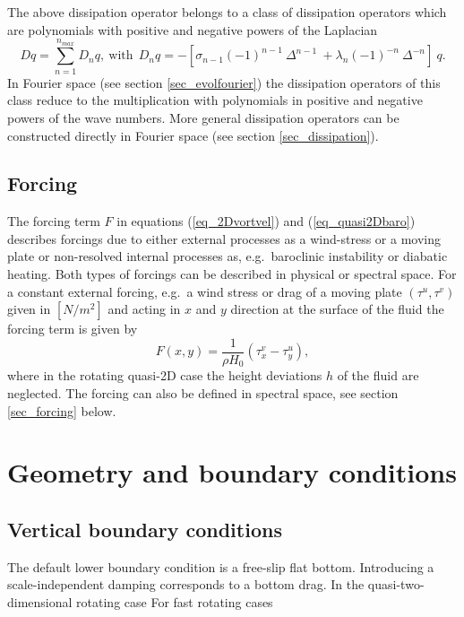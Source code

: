The above dissipation operator belongs to a class of dissipation operators 
which are polynomials with positive and negative powers of the Laplacian
\begin{equation} \label{eq_Laplace_dissip_poly}
  D q = \sum_{n = 1}^{n_{max}} D_{n} q,
  \ \mbox{with} \ \
  D_{n} q 
   = 
 -\left[
   \sigma_{n-1} \left(-1 \right)^{n-1} \ \Delta^{n-1}
   \ +
   \lambda_{n} \left(-1 \right)^{-n} \ \Delta^{-n}
  \right] \ q.
\end{equation}
In Fourier space (see section \ref{sec_evolfourier}) the dissipation 
operators of this class reduce to the multiplication with polynomials 
in positive and negative powers of the wave numbers. More general 
dissipation operators can be constructed directly in Fourier space 
(see section \ref{sec_dissipation}).

\subsection{Forcing}
The forcing term $F$ in equations (\ref{eq_2Dvortvel}) and 
(\ref{eq_quasi2Dbaro}) describes forcings due to either 
external processes as a wind-stress or a moving plate or
non-resolved internal processes as, e.g.\ baroclinic instability 
or diabatic heating. Both types of forcings can be described 
in physical or spectral space. For a constant external forcing, 
e.g.\ a wind stress or drag of a moving plate $(\tau^{u},\tau^{v})$ 
given in $[N/m^{2}]$ and acting in $x$ and $y$ direction at the surface 
of the fluid the forcing term is given by 
\begin{equation} \label{eq_Fstressdrag}
 F(x,y) = \frac{1}{\rho H_{0}} \left( \tau_{x}^{v} - \tau_{y}^{u} \right),
\end{equation}
where in the rotating quasi-2D case the height deviations $h$ of the
fluid are neglected. The forcing can also be defined in spectral
space, see section \ref{sec_forcing} below.
\section{Geometry and boundary conditions}
%
\subsection{Vertical boundary conditions}
%
The default lower boundary condition is a free-slip flat bottom.
Introducing a scale-independent damping corresponds to a bottom drag.
In the quasi-two-dimensional rotating case For fast rotating cases

